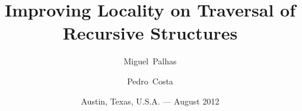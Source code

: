 \title[Improving Locality]{Improving Locality on Traversal of Recursive Structures}

\author[M.~Palhas\and P.~Costa]{Miguel~Palhas\and Pedro~Costa}

\date{Austin, Texas, U.S.A. --- August 2012}

\subject{Summer Internship}

